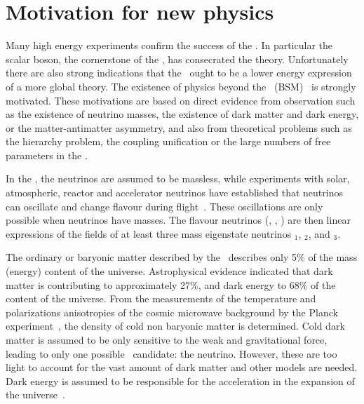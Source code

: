 


\clearpage
\section{Motivation for new physics}
\label{sec:BSM}
Many high energy experiments confirm the success of the \SM. In particular the scalar boson, the cornerstone of the \SM, has consecrated the theory. Unfortunately there are also strong indications that the \SM\ ought to be a lower energy expression of a more global theory. The existence of physics beyond the \SM\ (BSM)~\cite{BSMWiley} is strongly motivated. These motivations are based on direct evidence from observation such as the existence of neutrino masses, the existence of dark matter and dark energy, or the matter-antimatter asymmetry, and also from theoretical problems such as the hierarchy problem, the coupling unification or the large numbers of free parameters in the \SM. 


In the \SM, the neutrinos are assumed to be massless, while experiments with solar, atmospheric, reactor and accelerator neutrinos have established that neutrinos can oscillate and change flavour during flight~\cite{Fukuda:1998mi,PhysRevLett.108.131801}. These oscillations are only possible when neutrinos have masses. The flavour neutrinos (\Pnue, \Pnum, \Pnut) are then linear expressions of the fields of at least three mass eigenstate neutrinos \Pnu$_1$, \Pnu$_2$, and \Pnu$_3$. 

The ordinary or baryonic matter described by the \SM\ describes only 5\% of the mass (energy) content of the universe. Astrophysical evidence indicated that dark matter is contributing to approximately 27\%, and dark energy to 68\% of the content of the universe. From the measurements of the temperature and polarizations anisotropies of the cosmic microwave background by the Planck experiment~\cite{Ade:2015xua}, the density of cold non baryonic matter is determined. Cold dark matter is assumed to be only sensitive to the weak and gravitational force, leading to only one possible \SM\ candidate: the neutrino. However, these are too light to account for the vast amount of dark matter and other models are needed. Dark energy is assumed to be responsible for the acceleration in the expansion of the universe~\cite{Peebles:2002gy}. 

